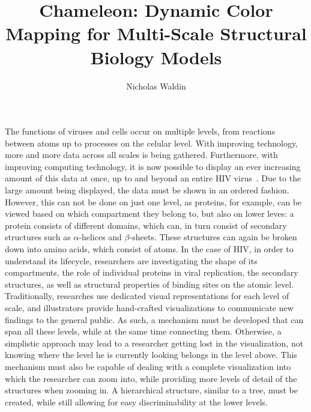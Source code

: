 \documentclass[review,journal]{vgtc}         %
\title{Chameleon: Dynamic Color Mapping	for Multi-Scale Structural Biology Models}
\author{Nicholas Waldin}
\begin{document}

\maketitle
The functions of viruses and cells occur on multiple levels, from reactions between atoms up to processes on the celular level. 
With improving technology, more and more data across all scales is being gathered. 
Furthermore, with improving computing technology, it is now possible to display an ever increasing amount of this data at once, up to and beyond an entire HIV virus~\cite{muzic2015cellview}.
Due to the large amount being displayed, the data must be shown in an ordered fashion. 
However, this can not be done on just one level, as proteins, for example, can be viewed based on which compartment they belong to, but also on lower leves: a protein consists of different domains, which can, in turn consist of secondary structures such as $\alpha$-helices and $\beta$-sheets. 
These structures can again be broken down into amino acids, which consist of atoms. 
In the case of HIV, in order to understand its lifecycle, researchers are investigating the shape of its compartments, the role of individual proteins in viral replication, the secondary structures, as well as structural properties of binding sites on the atomic level. 
Traditionally, researches use dedicated visual representations for each level of scale, and illustrators provide hand-crafted visualizations to communicate new findings to the general public. 
As such, a mechanism must be developed that can span all these levels, while at the same time connecting them.
Otherwise, a simplistic approach may lead to a researcher getting lost in the visualization, not knowing where the level he is currently looking belongs in the level above.
This mechanism must also be capable of dealing with a complete visualization into which the researcher can zoom into, while providing more levels of detail of the structures when zooming in. 
A hierarchical structure, similar to a tree, must be created, while still allowing for easy discriminability at the lower levels.
 
\end{document}
